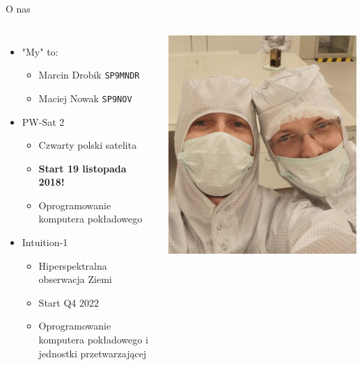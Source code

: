 \documentclass[ignorenonframetext]{beamer}
\begin{document}
\begin{frame}{O nas}
\begin{columns}

\begin{itemize}
	\item "My" to:
	\begin{itemize}
		\item Marcin Drobik \texttt{SP9MNDR}
		\item Maciej Nowak \texttt{SP9NOV}
	\end{itemize}
	\item PW-Sat 2
	\begin{itemize}
		\item Czwarty polski satelita
		\item \textbf{Start 19 listopada 2018!}
		\item Oprogramowanie komputera pokładowego
	\end{itemize} 
	\item Intuition-1
	\begin{itemize}
		\item Hiperspektralna obserwacja Ziemi
		\item Start Q4 2022
		\item Oprogramowanie komputera pokładowego i jednostki przetwarzającej
	\end{itemize} 
\end{itemize}

\includegraphics[scale=0.3]{images/we.png}
\end{columns}
\end{frame}
\end{document}
